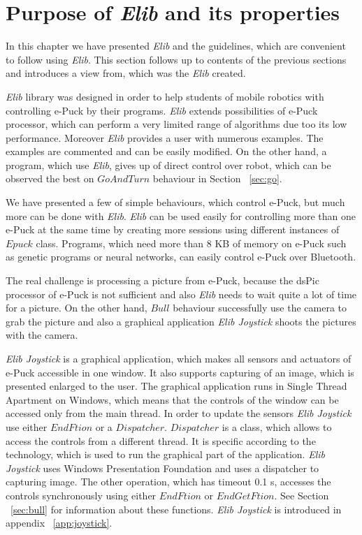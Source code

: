 \section{Purpose of {\it Elib} and its properties}
  In this chapter we have presented {\it Elib} and the guidelines, 
  which are convenient to follow using {\it Elib}. 
  This section follows up to contents of the previous sections and introduces a view from,
  which was the {\it Elib} created.

  {\it Elib} library was designed in order to help students of mobile robotics	
  with controlling e-Puck by their programs.
  {\it Elib} extends possibilities of e-Puck processor, 
  which can perform a very limited range of algorithms
  due too its low performance.
  Moreover {\it Elib} provides a user with numerous examples. The examples are commented
  and can be easily modified.
  On the other hand, a program, which use {\it Elib}, gives up of direct control over robot,
  which can be observed the best on $GoAndTurn$ behaviour in Section ~\ref{sec:go}.

  We have presented a few of simple behaviours, which control e-Puck, 
  but much more can be done with {\it Elib}.
  {\it Elib} can be used easily for controlling more than one e-Puck at the same time
  by creating more sessions using
  different instances of $Epuck$ class. Programs, which need more than 8 KB of memory on e-Puck such 
  as genetic programs or neural networks, can easily control e-Puck over Bluetooth.

  The real challenge is processing a picture from e-Puck, 
  because the dsPic processor of e-Puck is not sufficient
  and also {\it Elib} needs to wait quite a lot of time for a picture.
  On the other hand, $Bull$ behaviour successfully use the camera to grab the picture
  and also a graphical application {\it Elib Joystick} shoots the pictures with the camera.

  {\it Elib Joystick} is a graphical application, which makes all sensors and actuators of e-Puck accessible in one window.
  It also supports capturing of an image, which is presented enlarged to the user.
  The graphical application runs in Single Thread Apartment on Windows, which means that the controls of the window can 
  be accessed only from the main thread.
  In order to update the sensors {\it Elib Joystick} use either $EndFtion$ or a $Dispatcher$.
  $Dispatcher$ is a class, which allows to access the controls from a different thread. 
  It is specific according to the technology,
  which is used to run the graphical part of the application. 
  {\it Elib Joystick} uses Windows Presentation Foundation and
  uses a dispatcher to capturing image. The other operation, 
  which has timeout 0.1 s, accesses the controls synchronously using
  either $EndFtion$ or $EndGetFtion$. See Section ~\ref{sec:bull} for information 
  about these functions. {\it Elib Joystick} is introduced in appendix ~\ref{app:joystick}.

